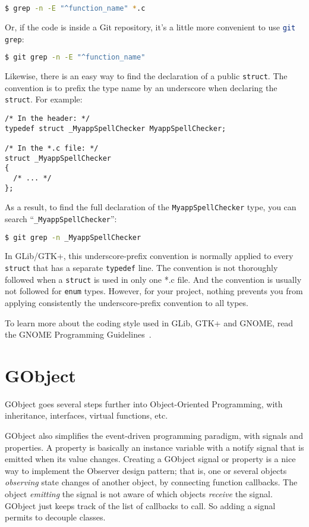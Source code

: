 \begin{lstlisting}[language=bash]
$ grep -n -E "^function_name" *.c
\end{lstlisting}

Or, if the code is inside a Git repository, it's a little more convenient to use \lstinline[language=bash]{git grep}:

\begin{lstlisting}[language=bash]
$ git grep -n -E "^function_name"
\end{lstlisting}

Likewise, there is an easy way to find the declaration of a public \lstinline{struct}. The convention is to prefix the type name by an underscore when declaring the \lstinline{struct}. For example:
\begin{lstlisting}
/* In the header: */
typedef struct _MyappSpellChecker MyappSpellChecker;

/* In the *.c file: */
struct _MyappSpellChecker
{
  /* ... */
};
\end{lstlisting}

As a result, to find the full declaration of the \lstinline{MyappSpellChecker} type, you can search ``\lstinline{_MyappSpellChecker}'':

\begin{lstlisting}[language=bash]
$ git grep -n _MyappSpellChecker
\end{lstlisting}

In GLib/GTK+, this underscore-prefix convention is normally applied to every \lstinline{struct} that has a separate \lstinline{typedef} line. The convention is not thoroughly followed when a \lstinline{struct} is used in only one *.c file. And the convention is usually not followed for \lstinline{enum} types. However, for your project, nothing prevents you from applying consistently the underscore-prefix convention to all types.

To learn more about the coding style used in GLib, GTK+ and GNOME, read the GNOME Programming Guidelines~\cite{gnome-programming-guidelines}.

\section{GObject}

GObject goes several steps further into Object-Oriented Programming, with inheritance, interfaces, virtual functions, etc.

GObject also simplifies the event-driven programming paradigm, with signals and properties. A property is basically an instance variable with a notify signal that is emitted when its value changes. Creating a GObject signal or property is a nice way to implement the Observer design pattern; that is, one or several objects \emph{observing} state changes of another object, by connecting function callbacks. The object \emph{emitting} the signal is not aware of which objects \emph{receive} the signal. GObject just keeps track of the list of callbacks to call. So adding a signal permits to decouple classes.

